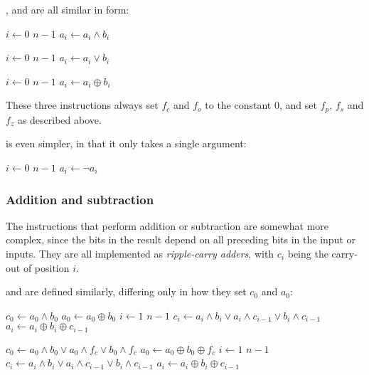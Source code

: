 \documentclass[a4paper,11pt]{kth-mag}
\renewcommand{\gets}{\leftarrow}
\newcommand{\AND}{\land}
\newcommand{\IOR}{\lor}
\newcommand{\XOR}{\oplus}
\newcommand{\NOT}{\lnot}
\begin{document}
,  and  are all similar in form:

\begin{codebox}
\zi \For $i \gets 0$ \To $n-1$
\zi \Do
      $a_i \gets a_i \AND b_i$
    \End
\end{codebox}

\begin{codebox}
\zi \For $i \gets 0$ \To $n-1$
\zi \Do
      $a_i \gets a_i \IOR b_i$
    \End
\end{codebox}

\begin{codebox}
\zi \For $i \gets 0$ \To $n-1$
\zi \Do
      $a_i \gets a_i \XOR b_i$
    \End
\end{codebox}

These three instructions always set $f_c$ and $f_o$ to the constant 0, and set $f_p$, $f_s$ and $f_z$ as described above.

 is even simpler, in that it only takes a single argument:

\begin{codebox}
\zi \For $i \gets 0$ \To $n-1$
\zi \Do
      $a_i \gets \NOT a_i$
    \End
\end{codebox}

\subsubsection{Addition and subtraction}

The instructions that perform addition or subtraction are somewhat more complex, since the bits in the result depend on all preceding bits in the input or inputs.
They are all implemented as \emph{ripple-carry adders}, with $c_i$ being the carry-out of position $i$.

 and  are defined similarly, differing only in how they set $c_0$ and $a_0$:

\begin{codebox}
\zi $c_0 \gets a_0 \AND b_0$
\zi $a_0 \gets a_0 \XOR b_0$
\zi \For $i \gets 1$ \To $n-1$
\zi \Do
      $c_i \gets a_i \AND b_i \IOR a_i \AND c_{i-1} \IOR b_i \AND c_{i-1}$
\zi   $a_i \gets a_i \XOR b_i \XOR c_{i-1}$
    \End
\end{codebox}

\begin{codebox}
\zi $c_0 \gets a_0 \AND b_0 \IOR a_0 \AND f_c \IOR b_0 \AND f_c$
\zi $a_0 \gets a_0 \XOR b_0 \XOR f_c$
\zi \For $i \gets 1$ \To $n-1$
\zi \Do
      $c_i \gets a_i \AND b_i \IOR a_i \AND c_{i-1} \IOR b_i \AND c_{i-1}$
\zi   $a_i \gets a_i \XOR b_i \XOR c_{i-1}$
    \End
\end{codebox}
\end{document}
